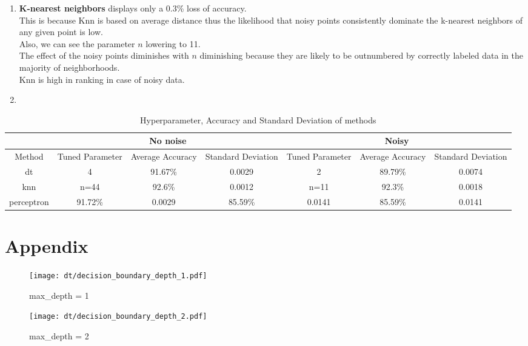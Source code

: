 \documentclass[acmconf,nonacm=true]{acmart}
\begin{document}
\begin{enumerate}
\begin{enumerate}
    \item \textbf{K-nearest neighbors} displays only a 0.3\% loss of accuracy.\\
    This is because Knn is based on average distance thus the likelihood that noisy points consistently dominate the k-nearest neighbors of any given point is low.\\
    Also, we can see the parameter $n$ lowering to 11.\\
    The effect of the noisy points diminishes with $n$ diminishing because they are likely to be outnumbered by correctly labeled data in the majority of neighborhoods.\\
    Knn is high in ranking in case of noisy data.
    \item 


\end{enumerate}
\begin{table}[H]
    \centering
    \caption{Hyperparameter, Accuracy and Standard Deviation of methods}
    \begin{tabular}{|c||c|c|c||c|c|c|}
    \hline
    \multicolumn{1}{|c||}{} &\multicolumn{3}{c||}{No noise} & \multicolumn{3}{c|}{Noisy} \\
    \hline
    Method & Tuned Parameter & Average Accuracy & Standard Deviation & Tuned Parameter & Average Accuracy & Standard Deviation\\
    \hline
    dt & 4 & 91.67\% & 0.0029 & 2 & 89.79\% & 0.0074\\
    knn & n=44 & 92.6\% & 0.0012 & n=11 & 92.3\% & 0.0018\\
    perceptron & 91.72\% & 0.0029 & 85.59\% & 0.0141 & 85.59\% & 0.0141\\
    \hline
    \end{tabular}
\end{table}

\end{enumerate}


\section{Appendix}
\begin{figure}[H]
    \centering  
    \texttt{[image: dt/decision\_boundary\_depth\_1.pdf]}
    \caption{max\_depth = 1}
\end{figure}

\begin{figure}[H]
    \centering
    \texttt{[image: dt/decision\_boundary\_depth\_2.pdf]}
    \caption{max\_depth = 2}
\end{figure}
\end{document}
